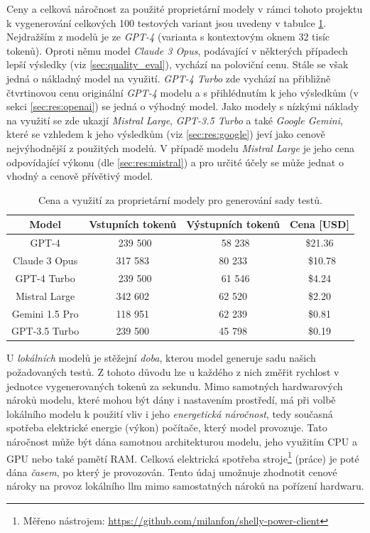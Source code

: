 \documentclass[czech, ma, kiv, he, iso690alph, pdf, viewonly]{fasthesis}
\begin{document}
    Ceny a celková náročnost za použité proprietární modely v rámci tohoto projektu k vygenerování celkových 100 testových variant jsou uvedeny v tabulce \ref{tab:eval:price}. Nejdražším z modelů je ze \textit{GPT-4} (varianta s kontextovým oknem 32 tisíc tokenů). Oproti němu model \textit{Claude 3 Opus}, podávající v některých případech lepší výsledky (viz \ref{sec:quality_eval}), vychází na poloviční cenu. Stále se však jedná o nákladný model na využití. \textit{GPT-4 Turbo} zde vychází na přibližně čtvrtinovou cenu originální \textit{GPT-4} modelu a s přihlédnutím k jeho výsledkům (v sekci \ref{sec:res:openai}) se jedná o výhodný model. Jako modely s nízkými náklady na využití se zde ukazjí \textit{Mistral Large}, \textit{GPT-3.5 Turbo} a také \textit{Google Gemini}, které se vzhledem k jeho výsledkům (viz \ref{sec:res:google}) jeví jako cenově nejvýhodnější z použitých modelů. V případě modelu \textit{Mistral Large} je jeho cena odpovídající výkonu (dle \ref{sec:res:mistral}) a pro určité účely se může jednat o vhodný a cenově přívětivý model.

    \begin{table}[H]
        \begin{tabular}{|c|c|c|c|}
            \hline
            \textbf{Model} & \textbf{Vstupních tokenů} & \textbf{Výstupních tokenů} & \textbf{Cena} [USD] \\
            \hline
            GPT-4 & 239 500 & 58 238 & \$21.36 \\
            \hline
            Claude 3 Opus & 317 583 & 80 233 & \$10.78 \\
            \hline
            GPT-4 Turbo & 239 500 & 61 546 & \$4.24 \\
            \hline
            Mistral Large & 342 602 & 62 520 & \$2.20 \\
            \hline
            Gemini 1.5 Pro & 118 951 & 62 239 & \$0.81 \\
            \hline
            GPT-3.5 Turbo & 239 500 & 45 798 & \$0.19 \\
            \hline
        \end{tabular}
        \centering
        \caption{Cena a využití za proprietární modely pro generování sady testů.}
        \label{tab:eval:price}
    \end{table}

    U \textit{lokálních} modelů je stěžejní \textit{doba}, kterou model generuje sadu našich požadovaných testů. Z tohoto důvodu lze u každého z nich změřit rychlost v jednotce vygenerovaných tokenů za sekundu. Mimo samotných hardwarových nároků modelu, které mohou být dány i nastavením prostředí, má při volbě lokálního modelu k použití vliv i jeho \textit{energetická náročnost}, tedy současná spotřeba elektrické energie (výkon) počítače, který model provozuje. Tato náročnost může být dána samotnou architekturou modelu, jeho využitím CPU a GPU nebo také pamětí RAM. \cite{zhang2023hardware} Celková elektrická spotřeba stroje\footnote{Měřeno nástrojem: \url{https://github.com/milanfon/shelly-power-client}} (práce) je poté dána \textit{časem}, po který je provozován. Tento údaj umožnuje zhodnotit cenové nároky na provoz lokálního \Gls{llm} mimo samostatných nároků na pořízení hardwaru.
\end{document}
